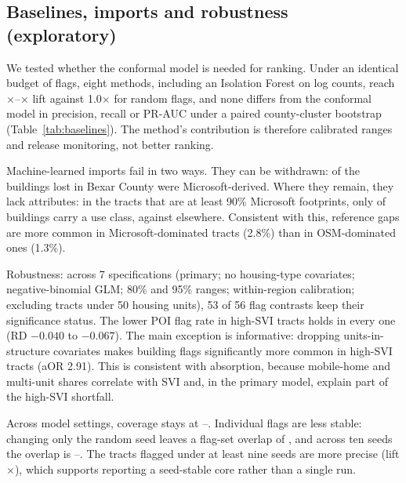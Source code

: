 \documentclass[conference]{IEEEtran}
\begin{document}
\subsection{Baselines, imports and robustness (exploratory)}
We tested whether the conformal model is needed for ranking. Under an identical budget of \MgBudget{} flags, eight methods, including an Isolation Forest on log counts, reach \MgLiftMin{}$\times$--\MgLiftMax{}$\times$ lift against 1.0$\times$ for random flags, and none differs from the conformal model in precision, recall or PR-AUC under a paired county-cluster bootstrap (Table~\ref{tab:baselines}). The method's contribution is therefore calibrated ranges and release monitoring, not better ranking.

\begin{table}[t]\centering\footnotesize
\caption{Exploratory: eight methods under one budget of \MgBudget{} flags, scored against the USA Structures gap (prevalence \PrevBldg{}). None differs significantly from the conformal model.}\label{tab:baselines}
\resizebox{\columnwidth}{!}{}
\end{table}

Machine-learned imports fail in two ways. They can be withdrawn: \MgRegMsftPooled{} of the buildings lost in Bexar County were Microsoft-derived. Where they remain, they lack attributes: in the \MgDomTracts{} tracts that are at least 90\% Microsoft footprints, only \MgDomLabel{} of buildings carry a use class, against \MgOtherLabel{} elsewhere. Consistent with this, reference gaps are more common in Microsoft-dominated tracts (2.8\%) than in OSM-dominated ones (1.3\%).

Robustness: across 7 specifications (primary; no housing-type covariates; negative-binomial GLM; 80\% and 95\% ranges; within-region calibration; excluding tracts under 50 housing units), 53 of 56 flag contrasts keep their significance status. The lower POI flag rate in high-SVI tracts holds in every one (RD $-0.040$ to $-0.067$). The main exception is informative: dropping units-in-structure covariates makes building flags significantly more common in high-SVI tracts (aOR 2.91). This is consistent with absorption, because mobile-home and multi-unit shares correlate with SVI and, in the primary model, explain part of the high-SVI shortfall.

Across \MgNVariants{} model settings, coverage stays at \MgCovMin{}--\MgCovMax{}. Individual flags are less stable: changing only the random seed leaves a flag-set overlap of \MgSeedOverlap{}, and across ten seeds the overlap is \JsPairMin{}--\JsPairMax{}. The \JsStable{} tracts flagged under at least nine seeds are more precise (lift \JsStableLift{}$\times$), which supports reporting a seed-stable core rather than a single run.
\end{document}

